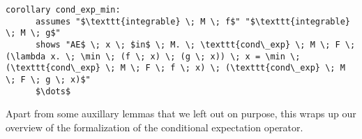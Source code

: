 \begin{isacorollary}
{\small
	\begin{lstlisting}[style=isabelle]
	corollary cond_exp_min:
	  assumes "$\texttt{integrable} \; M \; f$" "$\texttt{integrable} \; M \; g$"
	  shows "AE$ \; x \; $in$ \; M. \; \texttt{cond\_exp} \; M \; F \; (\lambda x. \; \min \; (f \; x) \; (g \; x)) \; x = \min \; (\texttt{cond\_exp} \; M \; F \; f \; x) \; (\texttt{cond\_exp} \; M \; F \; g \; x)$"
	  $\dots$
	\end{lstlisting}
}
\end{isacorollary}

Apart from some auxillary lemmas that we left out on purpose, this wraps up our overview of the formalization of the conditional expectation operator.

